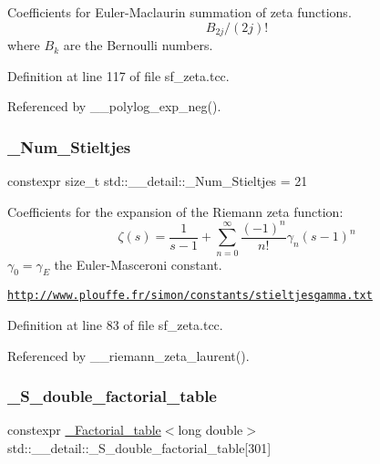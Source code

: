 Coefficients for Euler-\/\+Maclaurin summation of zeta functions. \[ B_{2j} / (2j)! \] where $ B_k $ are the Bernoulli numbers. 

Definition at line 117 of file sf\+\_\+zeta.\+tcc.



Referenced by \+\_\+\+\_\+polylog\+\_\+exp\+\_\+neg().

\mbox{\label{namespacestd_1_1____detail_a20c3b4334b0ffa9a5da21768d7830894}} 
\subsubsection{\texorpdfstring{\+\_\+\+Num\+\_\+\+Stieltjes}{\_Num\_Stieltjes}}
{\footnotesize\ttfamily constexpr size\+\_\+t std\+::\+\_\+\+\_\+detail\+::\+\_\+\+Num\+\_\+\+Stieltjes = 21}

Coefficients for the expansion of the Riemann zeta function\+: \[ \zeta(s) = \frac{1}{s-1} + \sum_{n=0}^{\infty}\frac{(-1)^n}{n!}\gamma_n(s-1)^n \] $ \gamma_0 = \gamma_E $ the Euler-\/\+Masceroni constant.

\href{http://www.plouffe.fr/simon/constants/stieltjesgamma.txt}{\tt http\+://www.\+plouffe.\+fr/simon/constants/stieltjesgamma.\+txt} 

Definition at line 83 of file sf\+\_\+zeta.\+tcc.



Referenced by \+\_\+\+\_\+riemann\+\_\+zeta\+\_\+laurent().

\mbox{\label{namespacestd_1_1____detail_a6d1131fefdb30b2746c76ff801bdc833}} 
\subsubsection{\texorpdfstring{\+\_\+\+S\+\_\+double\+\_\+factorial\+\_\+table}{\_S\_double\_factorial\_table}}
{\footnotesize\ttfamily constexpr \hyperlink{structstd_1_1____detail_1_1__Factorial__table}{\+\_\+\+Factorial\+\_\+table}$<$long double$>$ std\+::\+\_\+\+\_\+detail\+::\+\_\+\+S\+\_\+double\+\_\+factorial\+\_\+table\mbox{[}301\mbox{]}}



